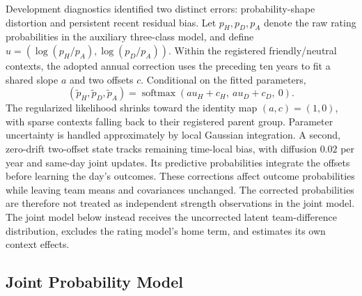 Development diagnostics identified two distinct errors: probability-shape distortion and persistent recent residual bias. Let $p_H,p_D,p_A$ denote the raw rating probabilities in the auxiliary three-class model, and define $u=(\log(p_H/p_A),\log(p_D/p_A))$. Within the registered friendly/neutral contexts, the adopted annual correction uses the preceding ten years to fit a shared slope $a$ and two offsets $c$. Conditional on the fitted parameters,
\begin{equation}
 (\widetilde p_H,\widetilde p_D,\widetilde p_A)
 =\operatorname{softmax}(a u_H+c_H,\ a u_D+c_D,\ 0).
 \label{eq:shape-correction}
\end{equation}
The regularized likelihood shrinks toward the identity map $(a,c)=(1,0)$, with sparse contexts falling back to their registered parent group. Parameter uncertainty is handled approximately by local Gaussian integration. A second, zero-drift two-offset state tracks remaining time-local bias, with diffusion $0.02$ per year and same-day joint updates. Its predictive probabilities integrate the offsets before learning the day's outcomes. These corrections affect outcome probabilities while leaving team means and covariances unchanged. The corrected probabilities are therefore not treated as independent strength observations in the joint model. The joint model below instead receives the uncorrected latent team-difference distribution, excludes the rating model's home term, and estimates its own context effects.

\subsection{Joint Probability Model}
\label{sec:joint-method}

